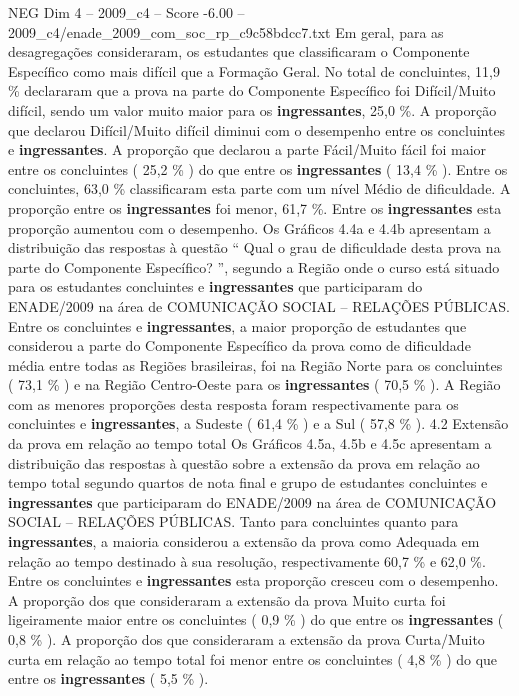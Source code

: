 \begin{textsample}{NEG Dim 4 – 2009\_c4 – Score -6.00 – 2009\_c4/enade\_2009\_com\_soc\_rp\_c9c58bdcc7.txt}
Em geral, para as desagregações consideraram, os estudantes que classificaram o Componente Específico como mais difícil que a Formação Geral.
No total de concluintes, 11,9 \% declararam que a prova na parte do Componente Específico foi Difícil/Muito difícil, sendo um valor muito maior para os \textbf{ingressantes}, 25,0 \%.
A proporção que declarou Difícil/Muito difícil diminui com o desempenho entre os concluintes e \textbf{ingressantes}.
A proporção que declarou a parte Fácil/Muito fácil foi maior entre os concluintes ( 25,2 \% ) do que entre os \textbf{ingressantes} ( 13,4 \% ).
Entre os concluintes, 63,0 \% classificaram esta parte com um nível Médio de dificuldade.
A proporção entre os \textbf{ingressantes} foi menor, 61,7 \%.
Entre os \textbf{ingressantes} esta proporção aumentou com o desempenho.
Os Gráficos 4.4a e 4.4b apresentam a distribuição das respostas à questão “ Qual o grau de dificuldade desta prova na parte do Componente Específico? ”, segundo a Região onde o curso está situado para os estudantes concluintes e \textbf{ingressantes} que participaram do ENADE/2009 na área de COMUNICAÇÃO SOCIAL – RELAÇÕES PÚBLICAS.
Entre os concluintes e \textbf{ingressantes}, a maior proporção de estudantes que considerou a parte do Componente Específico da prova como de dificuldade média entre todas as Regiões brasileiras, foi na Região Norte para os concluintes ( 73,1 \% ) e na Região Centro-Oeste para os \textbf{ingressantes} ( 70,5 \% ).
A Região com as menores proporções desta resposta foram respectivamente para os concluintes e \textbf{ingressantes}, a Sudeste ( 61,4 \% ) e a Sul ( 57,8 \% ). 4.2 Extensão da prova em relação ao tempo total Os Gráficos 4.5a, 4.5b e 4.5c apresentam a distribuição das respostas à questão sobre a extensão da prova em relação ao tempo total segundo quartos de nota final e grupo de estudantes concluintes e \textbf{ingressantes} que participaram do ENADE/2009 na área de COMUNICAÇÃO SOCIAL – RELAÇÕES PÚBLICAS.
Tanto para concluintes quanto para \textbf{ingressantes}, a maioria considerou a extensão da prova como Adequada em relação ao tempo destinado à sua resolução, respectivamente 60,7 \% e 62,0 \%.
Entre os concluintes e \textbf{ingressantes} esta proporção cresceu com o desempenho.
A proporção dos que consideraram a extensão da prova Muito curta foi ligeiramente maior entre os concluintes ( 0,9 \% ) do que entre os \textbf{ingressantes} ( 0,8 \% ).
A proporção dos que consideraram a extensão da prova Curta/Muito curta em relação ao tempo total foi menor entre os concluintes ( 4,8 \% ) do que entre os \textbf{ingressantes} ( 5,5 \% ).

\end{textsample}
